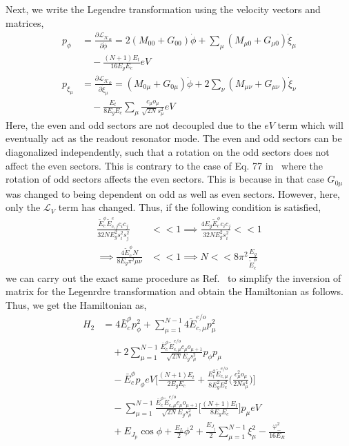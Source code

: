 \documentclass[%
reprint,
superscriptaddress,
 amsmath,amssymb,
 aps,
 prx,
longbibliography,
floatfix,
]{revtex4-2}
\begin{document}
Next, we write the Legendre transformation using the velocity vectors and matrices,
\begin{align}
     p_{\phi}&=\frac{\partial \mathcal{L_K}_o}{\partial \dot{\phi}}=2(M_{00}+G_{00}) \dot{\phi}+\sum_{\mu}(M_{\mu 0}+G_{\mu 0})\dot{\xi}_{\mu}\nonumber\\
    &\quad-\frac{(N+1)E_t}{16E_gE_c}eV\\
    p_{\xi_\mu}&=\frac{\partial \mathcal{L_K}_o}{\partial \dot{\xi}_\mu}=(M_{0\mu}+G_{0\mu}) \dot{\phi}+2\sum_{\nu} (M_{\mu\nu}+G_{\mu\nu}) \dot{\xi}_\nu\nonumber\\
    &\quad-\frac{E_t}{8E_gE_c} \sum_\mu\frac{c_\mu o_\mu}{\sqrt{2N}s_\mu^2}eV
    \end{align}
Here, the even and odd sectors are not decoupled due to the $eV$ term which will eventually act as the readout resonator mode. The even and odd sectors can be diagonalized independently, such that a rotation on the odd sectors does not affect the even sectors. This is contrary to the case of Eq. 77 in~\cite{viola2015collective} where the rotation of odd sectors affects the even sectors. This is because in that case $G_{0\mu}$ was changed to being dependent on odd as well as even sectors. However, here, only the $\mathcal{L}_V$ term has changed. Thus, if the following condition is satisfied, 
\begin{align}
     \frac{\tilde{E}_{c}^{\phi}\tilde{E}_{c,j}^{e}c_i c_j}{32NE_g^2s_i^2 s_j^2}&<<1\implies \frac{4E_g\tilde{E}_{c}^{\phi}c_i c_j}{32NE_g^2s_i^2 }<<1\\
     \implies \frac{4\tilde{E}_{c}^{\phi}N}{8E_g \pi^2\mu\nu }&<<1\implies N<<8\pi^2\frac{E_g}{\tilde{E}_{c}^{\phi}}
 \end{align}
we can carry out the exact same procedure as Ref.~\cite{viola2015collective} to simplify the inversion of matrix for the Legenrdre transformation and obtain the Hamiltonian as follows. Thus, we get the Hamiltonian as,
 \begin{align}
\quad H_2&= 4\bar{E}^\phi_cp_\phi^2+\sum_{\mu=1}^{N-1} 4\tilde{E}^{e/o}_{c,\mu}p_\mu^2\nonumber\\
    &\quad+2\sum_{\mu=1}^{N-1} \frac{\bar{E}^\phi_c\tilde{E}^{e/o}_{c,\mu}c_\mu o_{\mu+1}}{\sqrt{2N}E_gs_\mu^2} p_\phi p_\mu \nonumber\\
&\quad -\bar{E}_c^\phi p_\phi eV\Big[\frac{(N+1)E_t}{2E_gE_c}+\frac{E_t^2\tilde{E}_{c,\mu}^{e/o}}{8E_g^2E_c^2} \Big(\frac{c_\mu^2 o_\mu}{2Ns_\mu^4}\Big)\Big]\nonumber\\
    &\quad- \sum_{\mu=1}^{N-1} \frac{\bar{E}^\phi_c\tilde{E}^{e/o}_{c,\mu}c_\mu o_{\mu+1}}{\sqrt{2N}E_gs_\mu^2}\Big[\frac{(N+1)E_t}{8E_gE_c} \Big]p_\mu eV\nonumber\\
&\quad +E_{J_p}\cos{\phi}+\frac{E_L}{2}\phi^2+\frac{E_{J_j}}{2}\sum_{\mu=1}^{N-1} \xi_\mu^2 -\frac{\varphi_{-}^2}{16E_{R}}
 \end{align}
\end{document}
